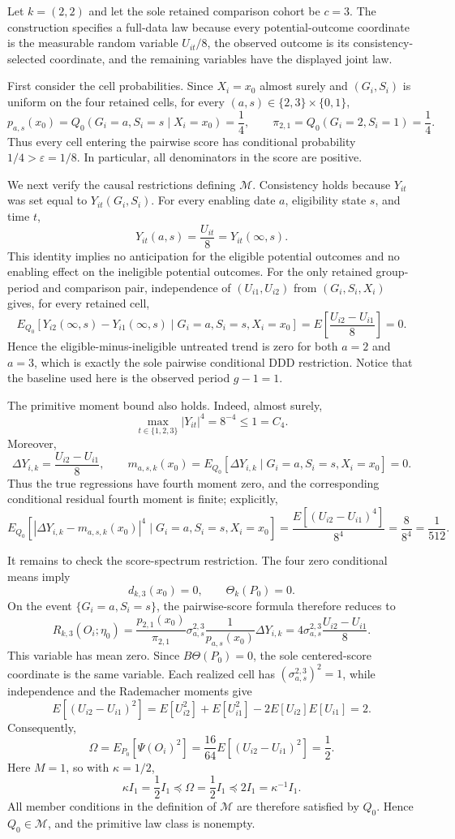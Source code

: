 Let \(k=(2,2)\) and let the sole retained comparison cohort be \(c=3\).  The construction specifies a full-data law because every potential-outcome coordinate is the measurable random variable \(U_{it}/8\), the observed outcome is its consistency-selected coordinate, and the remaining variables have the displayed joint law.

First consider the cell probabilities.  Since \(X_i=x_0\) almost surely and \((G_i,S_i)\) is uniform on the four retained cells, for every \((a,s)\in\{2,3\}\times\{0,1\}\),
\[
p_{a,s}(x_0)=Q_0(G_i=a,S_i=s\mid X_i=x_0)=\frac14,
\qquad
\pi_{2,1}=Q_0(G_i=2,S_i=1)=\frac14.
\]
Thus every cell entering the pairwise score has conditional probability \(1/4>\varepsilon=1/8\).  In particular, all denominators in the score are positive.

We next verify the causal restrictions defining \(\mathcal M\).  Consistency holds because \(Y_{it}\) was set equal to \(Y_{it}(G_i,S_i)\).  For every enabling date \(a\), eligibility state \(s\), and time \(t\),
\[
Y_{it}(a,s)=\frac{U_{it}}8=Y_{it}(\infty,s).
\]
This identity implies no anticipation for the eligible potential outcomes and no enabling effect on the ineligible potential outcomes.  For the only retained group-period and comparison pair, independence of \((U_{i1},U_{i2})\) from \((G_i,S_i,X_i)\) gives, for every retained cell,
\[
E_{Q_0}\!\left[Y_{i2}(\infty,s)-Y_{i1}(\infty,s)
 \mid G_i=a,S_i=s,X_i=x_0\right]
=E\!\left[\frac{U_{i2}-U_{i1}}8\right]=0.
\]
Hence the eligible-minus-ineligible untreated trend is zero for both \(a=2\) and \(a=3\), which is exactly the sole pairwise conditional DDD restriction.  Notice that the baseline used here is the observed period \(g-1=1\).

The primitive moment bound also holds.  Indeed, almost surely,
\[
\max_{t\in\{1,2,3\}}|Y_{it}|^4=8^{-4}\le 1=C_4.
\]
Moreover,
\[
\Delta Y_{i,k}=\frac{U_{i2}-U_{i1}}8,
\qquad
m_{a,s,k}(x_0)=E_{Q_0}[\Delta Y_{i,k}\mid G_i=a,S_i=s,X_i=x_0]=0.
\]
Thus the true regressions have fourth moment zero, and the corresponding conditional residual fourth moment is finite; explicitly,
\[
E_{Q_0}\!\left[|\Delta Y_{i,k}-m_{a,s,k}(x_0)|^4
 \mid G_i=a,S_i=s,X_i=x_0\right]
=\frac{E[(U_{i2}-U_{i1})^4]}{8^4}
=\frac{8}{8^4}=\frac1{512}.
\]

It remains to check the score-spectrum restriction.  The four zero conditional means imply
\[
d_{k,3}(x_0)=0,
\qquad
\Theta_k(P_0)=0.
\]
On the event \(\{G_i=a,S_i=s\}\), the pairwise-score formula therefore reduces to
\[
R_{k,3}(O_i;\eta_0)
=\frac{p_{2,1}(x_0)}{\pi_{2,1}}
  \sigma_{a,s}^{2,3}\frac{1}{p_{a,s}(x_0)}\Delta Y_{i,k}
=4\sigma_{a,s}^{2,3}\frac{U_{i2}-U_{i1}}8.
\]
This variable has mean zero.  Since \(B\Theta(P_0)=0\), the sole centered-score coordinate is the same variable.  Each realized cell has \((\sigma_{a,s}^{2,3})^2=1\), while independence and the Rademacher moments give
\[
E[(U_{i2}-U_{i1})^2]
=E[U_{i2}^2]+E[U_{i1}^2]-2E[U_{i2}]E[U_{i1}]
=2.
\]
Consequently,
\[
\Omega
=E_{P_0}[\Psi(O_i)^2]
=\frac{16}{64}E[(U_{i2}-U_{i1})^2]
=\frac12.
\]
Here \(M=1\), so with \(\kappa=1/2\),
\[
\kappa I_1=\frac12 I_1\preceq \Omega=\frac12 I_1
\preceq 2I_1=\kappa^{-1}I_1.
\]
All member conditions in the definition of \(\mathcal M\) are therefore satisfied by \(Q_0\).  Hence \(Q_0\in\mathcal M\), and the primitive law class is nonempty.